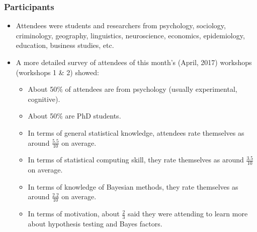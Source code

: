 \begin{frame}
	\frametitle{Participants}

	\begin{itemize}
		\item Attendees were students and researchers from psychology, sociology, criminology, geography, linguistics, neuroscience, economics, epidemiology, education, business studies, etc.
		\item A more detailed survey of attendees of this month's (April, 2017) workshops (workshops 1 \& 2) showed:
			\begin{itemize}
				\item About 50\% of attendees are from psychology (usually experimental, cognitive).
				\item About 50\% are PhD students.
				\item In terms of general statistical knowledge, attendees rate themselves as around $\tfrac{5.5}{10}$ on average.
				\item In terms of statistical computing skill, they rate themselves as around $\tfrac{3.5}{10}$ on average.
				\item In terms of knowledge of Bayesian methods, they rate themselves as around $\tfrac{2.2}{10}$ on average.
				\item In terms of motivation, about $\tfrac{2}{3}$ said they were attending to learn more about hypothesis testing and Bayes factors.
			\end{itemize}
	\end{itemize}

\end{frame}
